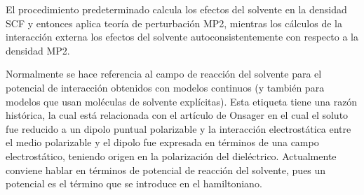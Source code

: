El procedimiento predeterminado calcula los efectos del solvente en 
la densidad SCF y entonces aplica teor\'ia de perturbaci\'on MP2, 
mientras los c\'alculos de la interacci\'on externa los efectos del
solvente autoconsistentemente con respecto a la densidad MP2.

Normalmente se hace referencia al campo de reacci\'on del solvente 
para el potencial de interacci\'on obtenidos con modelos continuos (y
tambi\'en para modelos que usan mol\'eculas de solvente 
expl\'icitas). Esta etiqueta tiene una raz\'on hist\'orica, la cual 
est\'a relacionada con el art\'iculo de Onsager en el cual el soluto
fue reducido a un dipolo puntual polarizable y la interacci\'on 
electrost\'atica entre el medio polarizable y el dipolo fue expresada
en t\'erminos de una campo electrost\'atico, teniendo origen en la 
polarizaci\'on del diel\'ectrico. Actualmente conviene hablar en 
t\'erminos de potencial de reacci\'on del solvente, pues un potencial
es el t\'ermino que se introduce en el hamiltoniano.


